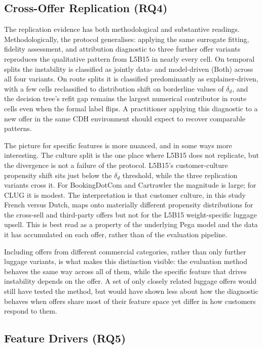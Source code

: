 \documentclass[oneside]{memoir} %
\begin{document}
\subsection{Cross-Offer Replication (RQ4)}

The replication evidence has both methodological and substantive readings. Methodologically, the protocol generalises: applying the same surrogate fitting, fidelity assessment, and attribution diagnostic to three further offer variants reproduces the qualitative pattern from L5B15 in nearly every cell. On temporal splits the instability is classified as jointly data- and model-driven (Both) across all four variants. On route splits it is classified predominantly as explainer-driven, with a few cells reclassified to distribution shift on borderline values of $\delta_d$, and the decision tree's refit gap remains the largest numerical contributor in route cells even when the formal label flips. A practitioner applying this diagnostic to a new offer in the same CDH environment should expect to recover comparable patterns.

The picture for specific features is more nuanced, and in some ways more interesting. The culture split is the one place where L5B15 does not replicate, but the divergence is not a failure of the protocol. L5B15's customer-culture propensity shift sits just below the $\delta_d$ threshold, while the three replication variants cross it. For BookingDotCom and Cartrawler the magnitude is large; for CLUG it is modest. The interpretation is that customer culture, in this study French versus Dutch, maps onto materially different propensity distributions for the cross-sell and third-party offers but not for the L5B15 weight-specific luggage upsell. This is best read as a property of the underlying Pega model and the data it has accumulated on each offer, rather than of the evaluation pipeline.

Including offers from different commercial categories, rather than only further luggage variants, is what makes this distinction visible: the evaluation method behaves the same way across all of them, while the specific feature that drives instability depends on the offer. A set of only closely related luggage offers would still have tested the method, but would have shown less about how the diagnostic behaves when offers share most of their feature space yet differ in how customers respond to them.

\subsection{Feature Drivers (RQ5)}
\end{document}
